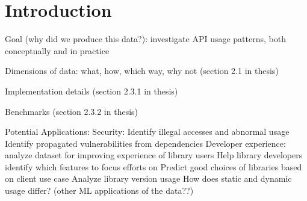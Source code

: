 \section{Introduction}
\label{sec:introduction}

Goal (why did we produce this data?):
investigate API usage patterns, both conceptually and in practice

Dimensions of data: what, how, which way, why not (section 2.1 in thesis)

Implementation details (section 2.3.1 in thesis)

Benchmarks (section 2.3.2 in thesis)

Potential Applications:
Security: 
Identify illegal accesses and abnormal usage
Identify propagated vulnerabilities from dependencies
Developer experience: analyze dataset for improving experience of library users
Help library developers identify which features to focus efforts on
Predict good choices of libraries based on client use case
Analyze library version usage
How does static and dynamic usage differ?
(other ML applications of the data??)
